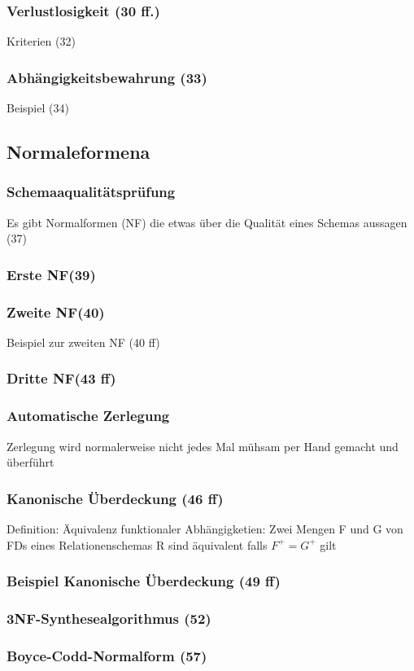 \subsubsection{Verlustlosigkeit (30 ff.)}
Kriterien (32)
\subsubsection{Abhängigkeitsbewahrung (33)}
Beispiel (34)
\subsection{Normaleformena}
\subsubsection{Schemaaqualitätsprüfung}
Es gibt Normalformen (NF) die etwas über die Qualität eines Schemas aussagen (37)
\subsubsection{Erste NF(39)}
\subsubsection{Zweite NF(40)}
Beispiel zur zweiten NF (40 ff)
\subsubsection{Dritte NF(43 ff)}
\subsubsection{Automatische Zerlegung}
Zerlegung wird normalerweise nicht jedes Mal mühsam per Hand gemacht und überführt
\subsubsection{Kanonische Überdeckung (46 ff)}
Definition: Äquivalenz funktionaler Abhängigketien: Zwei Mengen F und G von FDs eines Relationenschemas R sind äquivalent falls $F^+ = G^+$ gilt
\subsubsection{Beispiel Kanonische Überdeckung (49 ff)}
\subsubsection{3NF-Synthesealgorithmus (52)}
\subsubsection{Boyce-Codd-Normalform (57)}
